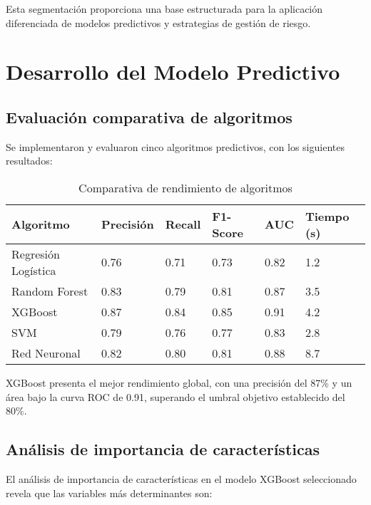 Esta segmentación proporciona una base estructurada para la aplicación diferenciada de modelos predictivos y estrategias de gestión de riesgo.

\section{Desarrollo del Modelo Predictivo}
\subsection{Evaluación comparativa de algoritmos}
Se implementaron y evaluaron cinco algoritmos predictivos, con los siguientes resultados:

\begin{table}[ht]
\centering
\begin{tabular}{|p{3cm}|p{1.5cm}|p{1.5cm}|p{1.5cm}|p{1.5cm}|p{1.5cm}|}
\hline
\textbf{Algoritmo} & \textbf{Precisión} & \textbf{Recall} & \textbf{F1-Score} & \textbf{AUC} & \textbf{Tiempo (s)} \\
\hline
Regresión Logística & 0.76 & 0.71 & 0.73 & 0.82 & 1.2 \\
\hline
Random Forest & 0.83 & 0.79 & 0.81 & 0.87 & 3.5 \\
\hline
XGBoost & 0.87 & 0.84 & 0.85 & 0.91 & 4.2 \\
\hline
SVM & 0.79 & 0.76 & 0.77 & 0.83 & 2.8 \\
\hline
Red Neuronal & 0.82 & 0.80 & 0.81 & 0.88 & 8.7 \\
\hline
\end{tabular}
\caption{Comparativa de rendimiento de algoritmos}
\end{table}

XGBoost presenta el mejor rendimiento global, con una precisión del 87\% y un área bajo la curva ROC de 0.91, superando el umbral objetivo establecido del 80\%.

\subsection{Análisis de importancia de características}
El análisis de importancia de características en el modelo XGBoost seleccionado revela que las variables más determinantes son:

